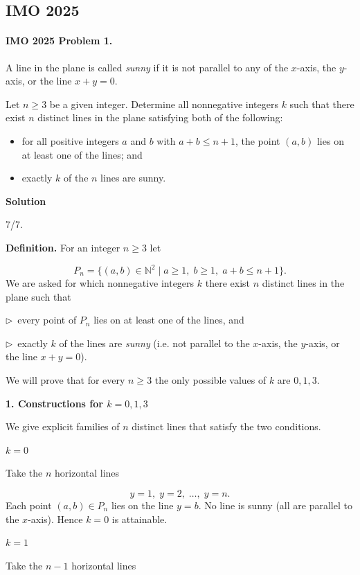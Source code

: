 \documentclass{llmxive}
\providecommand{\ii}{\item}
\providecommand{\solutionheading}[1]{\par\smallskip\noindent\textbf{#1}\par}
\providecommand{\compactbullet}[1]{\par\noindent$\triangleright$~#1\par}
\begin{document}
\subsection{IMO 2025}
\vspace{1em}
\paragraph{IMO 2025 Problem 1.}
\begin{mdframed}[style=mdpurplebox,frametitle={IMO 2025 Problem 1}]
A line in the plane is called \emph{sunny}
if it is not parallel to any of the $x$-axis, the $y$-axis, or the line $x+y=0$.

Let $n \ge 3$ be a given integer.
Determine all nonnegative integers $k$ such that there exist $n$ distinct lines
in the plane satisfying both of the following:
\begin{itemize}
\ii for all positive integers $a$ and $b$ with $a+b\le n+1$,
  the point $(a,b)$ lies on at least one of the lines; and
\ii exactly $k$ of the $n$ lines are sunny.
\end{itemize}
\end{mdframed}
\solutionheading{Solution}
\begin{remark*}
  7/7.
\end{remark*}
\textbf{Definition.} For an integer \(n\ge 3\) let\par
\[
P_n = \{(a,b)\in\mathbb{N}^2 \mid a\ge 1,\; b\ge 1,\; a+b\le n+1\}.
\]
We are asked for which nonnegative integers \(k\) there exist \(n\) distinct lines in the plane such that\par
\compactbullet{every point of \(P_n\) lies on at least one of the lines, and}
\compactbullet{exactly \(k\) of the lines are \emph{sunny} (i.e. not parallel to the \(x\)-axis, the \(y\)-axis, or the line \(x+y=0\)).}
We will prove that for every \(n\ge 3\) the only possible values of \(k\) are \(0,1,3\).\par
\smallskip
\solutionheading{1. Constructions for \(k = 0,1,3\)}
We give explicit families of \(n\) distinct lines that satisfy the two conditions.\par
\solutionheading{\(k = 0\)}
Take the \(n\) horizontal lines\par
\[
y = 1,\; y = 2,\; \dots,\; y = n.
\]
Each point \((a,b)\in P_n\) lies on the line \(y = b\). No line is sunny (all are parallel to the \(x\)-axis). Hence \(k = 0\) is attainable.\par
\solutionheading{\(k = 1\)}
Take the \(n-1\) horizontal lines\par
\end{document}
